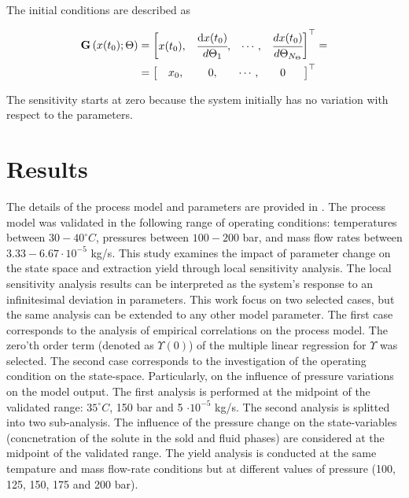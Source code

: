 \documentclass[a4paper,fleqn]{cas-dc}
\begin{document}
	The initial conditions are described as
	
	{\footnotesize
		\begin{align}
			{\textbf{G}}\left(x(t_0);\Theta\right)  	   &= 
			\begin{bmatrix}
				x(t_0),						               &
				\cfrac{ \text{d}x(t_0) }{ d{\Theta_1} },   &
				\cdots,					 				   &
				\cfrac{ dx(t_0) }{ d{\Theta_{N_\Theta}} }            
			\end{bmatrix}^\top = \\ 					   &=
			\begin{bmatrix} 
				\quad x_0,	                               &
				\quad ~0,		                           &
				\quad \cdots,			                   &
				\quad 0 \quad~~
			\end{bmatrix}^\top \nonumber
	\end{align} }

	{\color{blue} The sensitivity starts at zero because the system initially has no variation with respect to the parameters.}
	
	
	\section{Results} \label{CH: Results}
	The details of the process model and parameters are provided in \citet{Sliczniuk2024}. The process model was validated in the following range of operating conditions: temperatures between $30 - 40 ^\circ C$, pressures between $100 - 200$ bar, and mass flow rates between $3.33-6.67 \cdot 10^{-5}$ kg/s. This study examines the impact of parameter change on the state space and extraction yield through local sensitivity analysis. The local sensitivity analysis results can be interpreted as the system's response to an infinitesimal deviation in parameters. {\color{blue}This work focus on two selected cases, but the same analysis can be extended to any other model parameter. The first case corresponds to the analysis of empirical correlations on the process model. The zero'th order term (denoted as $\Upsilon(0)$) of the multiple linear regression for $\Upsilon$ was selected. The second case corresponds to the investigation of the operating condition on the state-space. Particularly, on the influence of pressure variations on the model output. The first analysis is performed at the midpoint of the validated range: $35 ^\circ C$, 150 bar and 5 $\cdot 10^{-5}$ kg/s. The second analysis is splitted into two sub-analysis. The influence of the pressure change on the state-variables (concnetration of the solute in the sold and fluid phases) are considered at the midpoint of the validated range. The yield analysis is conducted at the same tempature and mass flow-rate conditions but at different values of pressure (100, 125, 150, 175 and 200 bar).}
	
\end{document}
